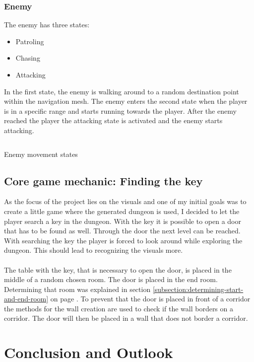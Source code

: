 \documentclass[a4paper,11pt,oneside]{scrreprt}
\begin{document}
\subsection{Enemy}
\label{subsection:enemy}
The enemy has three states:
\begin{itemize}
\item Patroling
\item Chasing
\item Attacking
\end{itemize}

In the first state, the enemy is walking around to a random destination point within the navigation mesh. The enemy enters the second state when the player is in a specific range and starts running towards the player. After the enemy reached the player the attacking state is activated and the enemy starts attacking.
\begin{listing}[ht]
    \inputminted[fontsize=\footnotesize,linenos]{csharp}{code/Enemy.cs}
    \caption[Enemy movement states]{Enemy movement states}
    \label{code:enemy-movement-states}
\end{listing}

\section{Core game mechanic: Finding the key}
\label{section:core-game-mechanic}
As the focus of the project lies on the visuals and one of my initial goals was to create a little game where the generated dungeon is used, I decided to let the player search a key in the dungeon. With the key it is possible to open a door that has to be found as well. Through the door the next level can be reached. With searching the key the player is forced to look around while exploring the dungeon. This should lead to recognizing the visuals more.
\\
\\
The table with the key, that is necessary to open the door, is placed in the middle of a random chosen room. The door is placed in the end room. Determining that room was explained in section \ref{subsection:determining-start-and-end-room} on page \pageref{subsection:determining-start-and-end-room}. To prevent that the door is placed in front of a corridor the methods for the wall creation are used to check if the wall borders on a corridor. The door will then be placed in a wall that does not border a corridor.

\chapter{Conclusion and Outlook}
\label{chapter:conclusion-and-outlook}
\end{document}
